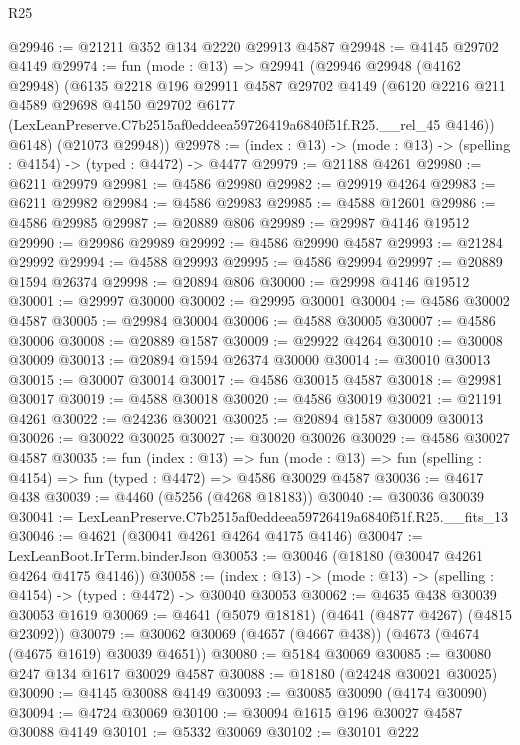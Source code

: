 \begin{lexlean}{R25}
\begin{coremodule}
@29946 := @21211 @352 @134 @2220 @29913 @4587
@29948 := @4145 @29702 @4149
@29974 := fun (mode : @13) =>
  @29941
    (@29946
      @29948
      (@4162 @29948)
      (@6135
        @2218
        @196
        @29911
        @4587
        @29702
        @4149
        (@6120
          @2216
          @211
          @4589
          @29698
          @4150
          @29702
          @6177
          (LexLeanPreserve.C7b2515af0eddeea59726419a6840f51f.R25.__rel_45 @4146))
        @6148)
      (@21073 @29948))
@29978 := (index : @13) -> (mode : @13) -> (spelling : @4154) -> (typed : @4472) -> @4477
@29979 := @21188 @4261
@29980 := @6211 @29979
@29981 := @4586 @29980
@29982 := @29919 @4264
@29983 := @6211 @29982
@29984 := @4586 @29983
@29985 := @4588 @12601
@29986 := @4586 @29985
@29987 := @20889 @806
@29989 := @29987 @4146 @19512
@29990 := @29986 @29989
@29992 := @4586 @29990 @4587
@29993 := @21284 @29992
@29994 := @4588 @29993
@29995 := @4586 @29994
@29997 := @20889 @1594 @26374
@29998 := @20894 @806
@30000 := @29998 @4146 @19512
@30001 := @29997 @30000
@30002 := @29995 @30001
@30004 := @4586 @30002 @4587
@30005 := @29984 @30004
@30006 := @4588 @30005
@30007 := @4586 @30006
@30008 := @20889 @1587
@30009 := @29922 @4264
@30010 := @30008 @30009
@30013 := @20894 @1594 @26374 @30000
@30014 := @30010 @30013
@30015 := @30007 @30014
@30017 := @4586 @30015 @4587
@30018 := @29981 @30017
@30019 := @4588 @30018
@30020 := @4586 @30019
@30021 := @21191 @4261
@30022 := @24236 @30021
@30025 := @20894 @1587 @30009 @30013
@30026 := @30022 @30025
@30027 := @30020 @30026
@30029 := @4586 @30027 @4587
@30035 := fun (index : @13) =>
  fun (mode : @13) => fun (spelling : @4154) => fun (typed : @4472) => @4586 @30029 @4587
@30036 := @4617 @438
@30039 := @4460 (@5256 (@4268 @18183))
@30040 := @30036 @30039
@30041 := LexLeanPreserve.C7b2515af0eddeea59726419a6840f51f.R25.__fits_13
@30046 := @4621 (@30041 @4261 @4264 @4175 @4146)
@30047 := LexLeanBoot.IrTerm.binderJson
@30053 := @30046 (@18180 (@30047 @4261 @4264 @4175 @4146))
@30058 := (index : @13) -> (mode : @13) -> (spelling : @4154) -> (typed : @4472) -> @30040 @30053
@30062 := @4635 @438 @30039 @30053 @1619
@30069 := @4641 (@5079 @18181) (@4641 (@4877 @4267) (@4815 @23092))
@30079 := @30062 @30069 (@4657 (@4667 @438)) (@4673 (@4674 (@4675 @1619) @30039 @4651))
@30080 := @5184 @30069
@30085 := @30080 @247 @134 @1617 @30029 @4587
@30088 := @18180 (@24248 @30021 @30025)
@30090 := @4145 @30088 @4149
@30093 := @30085 @30090 (@4174 @30090)
@30094 := @4724 @30069
@30100 := @30094 @1615 @196 @30027 @4587 @30088 @4149
@30101 := @5332 @30069
@30102 := @30101 @222

\end{coremodule}
\end{lexlean}
